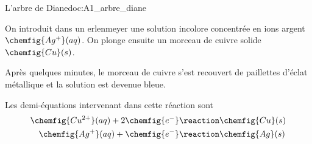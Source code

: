 \begin{doc}{L'arbre de Diane}{doc:A1_arbre_diane}
  \begin{wrapfigure}[4]{r}{0.1\linewidth}
    \vspace*{-24pt}
  \end{wrapfigure}
  
  On introduit dans un erlenmeyer une solution incolore concentrée en ions argent $\chemfig{Ag^+}(aq)$.
  On plonge ensuite un morceau de cuivre solide $\chemfig{Cu}(s)$.

  Après quelques minutes, le morceau de cuivre s'est recouvert de paillettes d'éclat métallique et la solution est devenue bleue.

  Les demi-équations intervenant dans  cette réaction sont
  \begin{align*}
    \chemfig{Cu^{2+}}(aq) + 2\chemfig{e^{-}} \reaction& \chemfig{Cu}(s) \\
    \chemfig{Ag^+}(aq) + \chemfig{e^{-}} \reaction& \chemfig{Ag}(s)
  \end{align*}
\end{doc}




